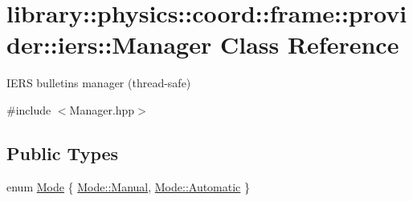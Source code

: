 \hypertarget{classlibrary_1_1physics_1_1coord_1_1frame_1_1provider_1_1iers_1_1_manager}{}\section{library\+:\+:physics\+:\+:coord\+:\+:frame\+:\+:provider\+:\+:iers\+:\+:Manager Class Reference}
\label{classlibrary_1_1physics_1_1coord_1_1frame_1_1provider_1_1iers_1_1_manager}


I\+E\+RS bulletins manager (thread-\/safe)  




{\ttfamily \#include $<$Manager.\+hpp$>$}

\subsection*{Public Types}
\begin{DoxyCompactItemize}
\item 
enum \hyperlink{classlibrary_1_1physics_1_1coord_1_1frame_1_1provider_1_1iers_1_1_manager_a84f44554ac04c5e18ed7ff448debf392}{Mode} \{ \hyperlink{classlibrary_1_1physics_1_1coord_1_1frame_1_1provider_1_1iers_1_1_manager_a84f44554ac04c5e18ed7ff448debf392ae1ba155a9f2e8c3be94020eef32a0301}{Mode\+::\+Manual}, 
\hyperlink{classlibrary_1_1physics_1_1coord_1_1frame_1_1provider_1_1iers_1_1_manager_a84f44554ac04c5e18ed7ff448debf392a086247a9b57fde6eefee2a0c4752242d}{Mode\+::\+Automatic}
 \}
\end{DoxyCompactItemize}
